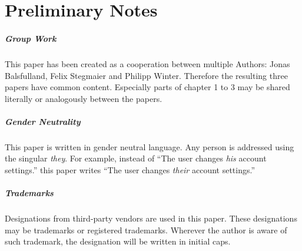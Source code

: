 \clearpage
\chapter*{Preliminary Notes}
\thispagestyle{empty}


\paragraph{Group Work}
This paper has been created as a cooperation between multiple Authors: 
Jonas Balsfulland, Felix Stegmaier and Philipp Winter.
Therefore the resulting three papers have common content.
Especially parts of chapter 1 to 3 may be shared literally or analogously between the papers.



\paragraph{Gender Neutrality}
This paper is written in gender neutral language.
Any person is addressed using the singular \textit{they}.
For example, instead of 
``The user changes \textit{his} account settings.''
this paper writes 
``The user changes \textit{their} account settings.''


\paragraph{Trademarks}
Designations from third-party vendors are used in this paper.
These designations may be trademarks or registered trademarks.
Wherever the author is aware of such trademark, 
the designation will be written in initial caps.


